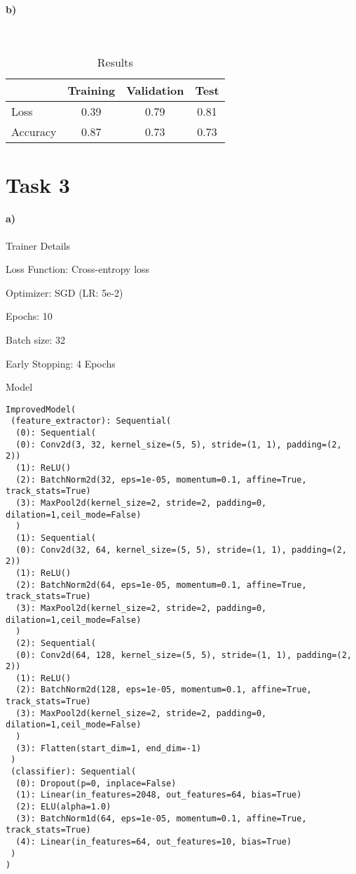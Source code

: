 \documentclass{article}
\begin{document}
\paragraph{b)}
\

\begin{table}[h!]
	\centering
	\caption{Results}
	\begin{tabular}[t]{lccc}
		\hline
		         & Training & Validation & Test \\
		\hline
		Loss     & 0.39     & 0.79       & 0.81 \\
		Accuracy & 0.87     & 0.73       & 0.73 \\
		\hline
	\end{tabular}
\end{table}%

\section*{Task 3}
\paragraph{a)}


Trainer Details


Loss Function: Cross-entropy loss

Optimizer: SGD (LR: 5e-2)


Epochs: 10


Batch size: 32


Early Stopping: 4 Epochs

\newpage
Model

\begin{lstlisting}
ImprovedModel(
 (feature_extractor): Sequential(
  (0): Sequential(
  (0): Conv2d(3, 32, kernel_size=(5, 5), stride=(1, 1), padding=(2, 2))
  (1): ReLU()
  (2): BatchNorm2d(32, eps=1e-05, momentum=0.1, affine=True, track_stats=True)
  (3): MaxPool2d(kernel_size=2, stride=2, padding=0, dilation=1,ceil_mode=False)
  )
  (1): Sequential(
  (0): Conv2d(32, 64, kernel_size=(5, 5), stride=(1, 1), padding=(2, 2))
  (1): ReLU()
  (2): BatchNorm2d(64, eps=1e-05, momentum=0.1, affine=True, track_stats=True)
  (3): MaxPool2d(kernel_size=2, stride=2, padding=0, dilation=1,ceil_mode=False)
  )
  (2): Sequential(
  (0): Conv2d(64, 128, kernel_size=(5, 5), stride=(1, 1), padding=(2, 2))
  (1): ReLU()
  (2): BatchNorm2d(128, eps=1e-05, momentum=0.1, affine=True, track_stats=True)
  (3): MaxPool2d(kernel_size=2, stride=2, padding=0, dilation=1,ceil_mode=False)
  )
  (3): Flatten(start_dim=1, end_dim=-1)
 )
 (classifier): Sequential(
  (0): Dropout(p=0, inplace=False)
  (1): Linear(in_features=2048, out_features=64, bias=True)
  (2): ELU(alpha=1.0)
  (3): BatchNorm1d(64, eps=1e-05, momentum=0.1, affine=True, track_stats=True)
  (4): Linear(in_features=64, out_features=10, bias=True)
 )
)
\end{lstlisting}
\end{document}
